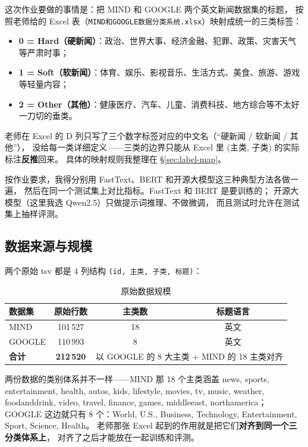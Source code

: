 \documentclass{SYSUReport}
\begin{document}
这次作业要做的事情是：把 MIND 和 GOOGLE 两个英文新闻数据集的标题，
按照老师给的 Excel 表（\texttt{MIND和GOOGLE数据分类系统.xlsx}）映射成统一的三类标签：

\begin{itemize}
    \item \textbf{0 = Hard（硬新闻）}：政治、世界大事、经济金融、犯罪、政策、灾害天气等严肃时事；
    \item \textbf{1 = Soft（软新闻）}：体育、娱乐、影视音乐、生活方式、美食、旅游、游戏等轻量内容；
    \item \textbf{2 = Other（其他）}：健康医疗、汽车、儿童、消费科技、地方综合等不太好一刀切的垂类。
\end{itemize}

老师在 Excel 的 D 列只写了三个数字标签对应的中文名（“硬新闻 / 软新闻 / 其他”），
没给每一类详细定义——三类的边界只能从 Excel 里 (主类, 子类) 的实际标注\textbf{反推}回来。
具体的映射规则我整理在 §\ref{sec:label-map}。

按作业要求，我得分别用 FastText、BERT 和开源大模型这三种典型方法各做一遍，
然后在同一个测试集上对比指标。FastText 和 BERT 是要训练的；
开源大模型（这里我选 Qwen2.5）只做提示词推理、不做微调，
而且测试时允许在测试集上抽样评测。

\subsection{数据来源与规模}

两个原始 tsv 都是 4 列结构 \texttt{(id, 主类, 子类, 标题)}：

\begin{table}[!htbp]
\centering
\caption{原始数据规模}
\label{tab:raw-stat}
\begin{tabular}{lccc}
\toprule
数据集 & 原始行数 & 主类数 & 标题语言 \\
\midrule
MIND \cite{wu2020mind}   & 101\,527 & 18 & 英文 \\
GOOGLE                   & 110\,993 &  8 & 英文 \\
\midrule
\textbf{合计}            & \textbf{212\,520} & \multicolumn{2}{c}{以 GOOGLE 的 8 大主类 + MIND 的 18 主类对齐} \\
\bottomrule
\end{tabular}
\end{table}

两份数据的类别体系并不一样——MIND 那 18 个主类涵盖
news, sports, entertainment, health, autos, kids, lifestyle, movies, tv, music,
weather, foodanddrink, video, travel, finance, games, middleeast, northamerica；
GOOGLE 这边就只有 8 个：World, U.S., Business, Technology, Entertainment, Sport, Science, Health。
老师那张 Excel 起到的作用就是把它们\textbf{对齐到同一个三分类体系上}，
对齐了之后才能放在一起训练和评测。
\end{document}
